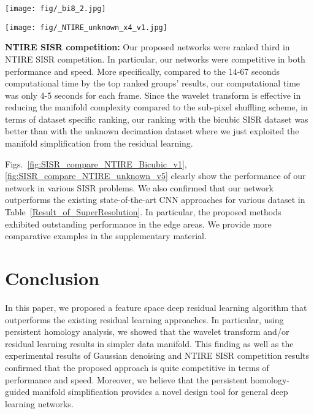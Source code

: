 \documentclass[10pt,twocolumn,letterpaper]{article}
\begin{document}
\begin{figure*}[t]
\centerline{\texttt{[image: fig/\_bi8\_2.jpg]}}
\caption{Performance comparison of SISR at scale factor of 4 of bicubic downsampling. The proposed network is RGB based competition network. Left : input, Center : restoration result, Right : label. }
\label{fig:SISR_compare_NTIRE_Bicubic_v1}
\end{figure*}

\begin{figure*}[t]
\centerline{\texttt{[image: fig/\_NTIRE\_unknown\_x4\_v1.jpg]}}
\caption{Performance comparison of SISR at scale factor of 4 of {\em unknown} downsampling. The proposed network is RGB based competition network. Left : input, Center : restoration result, Right : label. }
\label{fig:SISR_compare_NTIRE_unknown_v5}
\end{figure*}

{\bf NTIRE SISR competition:} 
Our proposed networks were ranked third in NTIRE SISR competition.
In particular, our networks were competitive in both performance and speed. More specifically, compared to the 14-67 seconds computational time by the top ranked groups' results,
our computational time was only 4-5 seconds for each frame.
Since the wavelet transform is effective in reducing the manifold complexity compared to the sub-pixel shuffling scheme, in terms of dataset specific
ranking, our ranking  with the bicubic SISR dataset was  better than with the unknown decimation dataset where we just exploited the
manifold simplification from the residual learning.


Figs.~\ref{fig:SISR_compare_NTIRE_Bicubic_v1}, \ref{fig:SISR_compare_NTIRE_unknown_v5}
clearly show the performance of our network in various SISR problems. We also confirmed that our network outperforms the existing state-of-the-art CNN approaches for various dataset in Table~\ref{Result_of_SuperResolution}. In particular, the proposed methods exhibited outstanding performance in the edge areas. We provide more comparative examples in the supplementary material.


\section{Conclusion}
In this paper, we proposed a feature space deep residual learning algorithm that outperforms the existing residual learning approaches. In particular, using persistent homology analysis,
we showed that
the wavelet transform and/or residual learning results in simpler data manifold. This finding as well as the experimental results of Gaussian denoising and NTIRE SISR competition results
confirmed that the proposed approach is quite competitive in terms of performance and speed.
Moreover, we believe that the persistent homology-guided manifold simplification 
provides a novel design tool for general deep learning networks.
\end{document}
